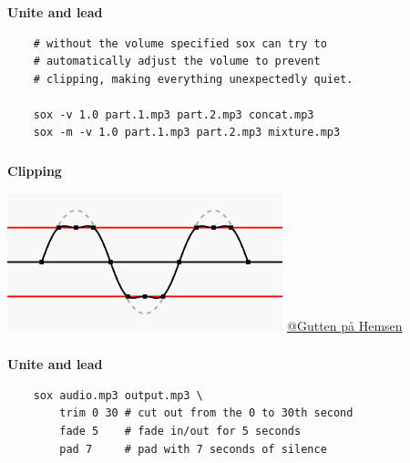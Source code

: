 \documentclass[usenames,dvipsnames, 18pt, compress, aspectratio=169]{beamer}
\begin{document}
\begin{frame}[fragile]{}
    \frametitle{}
    \begin{center}
        \textbf{Unite and lead}
        \vspace{0.2cm}

        \begin{verbatim}
    # without the volume specified sox can try to
    # automatically adjust the volume to prevent
    # clipping, making everything unexpectedly quiet.

    sox -v 1.0 part.1.mp3 part.2.mp3 concat.mp3
    sox -m -v 1.0 part.1.mp3 part.2.mp3 mixture.mp3
        \end{verbatim}
    \end{center}
\end{frame}

\begin{frame}[fragile]{}
    \frametitle{}
    \begin{center}
        \textbf{Clipping}
        \vspace{0.2cm}

        \includegraphics[width=0.6\textwidth]{clipping.png}
        \hspace*{-2cm}
        \href{https://en.wikipedia.org/wiki/File:Clipping.svg}
             {\color{black}\fontsize{5pt}{0}\selectfont @Gutten på Hemsen}

    \end{center}
\end{frame}

\begin{frame}[fragile]{}
    \frametitle{}
    \begin{center}
        \textbf{Unite and lead}
        \vspace{0.2cm}

        \begin{verbatim}
    sox audio.mp3 output.mp3 \
        trim 0 30 # cut out from the 0 to 30th second
        fade 5    # fade in/out for 5 seconds
        pad 7     # pad with 7 seconds of silence
        \end{verbatim}
    \end{center}
\end{frame}
\end{document}

